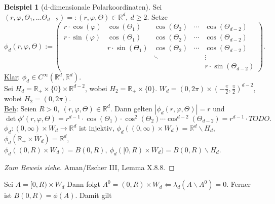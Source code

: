 \documentclass[a4paper]{report}
\newcommand{\R}{\mathbb{R}}
\newcommand{\jlabel}[1]{\label{j_#1}}
\newcommand{\jabb}[3]{ #1: #2 \rightarrow #3 }
\theoremstyle{plain}
\theoremstyle{definition}
\newtheorem{expl}[thm]{Beispiel}
\begin{document}
{{{{\begin{expl}[d-dimensionale Polarkoordinaten]
    \jlabel{Bsp 3.35}
    Sei $(r, \varphi, \Theta_1,\dots \Theta_{d-2}) =: (r,\varphi, \Theta) \in \R^d, \ d\ge 2$. Setze
    \begin{equation}
        \jlabel{(3.8)}
        \phi_d(r,\varphi,\Theta) := \begin{pmatrix}
                                            r\cdot \cos(\varphi) & \cos(\Theta_1)        & \cos(\Theta_2) & \cdots & \cos(\Theta_{d-2})\\
                                            r\cdot \sin(\varphi) & \cos(\Theta_1)        & \cos(\Theta_2) & \cdots & \cos(\Theta_{d-2})\\
                                                                 & r\cdot \sin(\Theta_1) & \cos(\Theta_2) & \cdots & \cos(\Theta_{d-2})\\
                                                                 &                       & \ddots         &        & \vdots \\
                                                                 &                       &                &        & r\cdot \sin(\Theta_{d-2})
                                        \end{pmatrix}.
    \end{equation}
    \uline{Klar}: $\phi_d \in C^\infty(\R^d, \R^d)$.\\
    Sei $H_d = \R_+\times \{0\} \times \R^{d-2}$, wobei $H_2 = \R_+\times \{0\}$. $W_d = (0,2\pi)\times(-\frac{\pi}{2}, \frac{\pi}{2})^{d-2}$, wobei $H_2 = (0,2\pi)$.\\
    \uline{Beh}: Seien $R>0,\ (r, \varphi, \Theta) \in \R^d$. Dann gelten $|\phi_d(r,\varphi, \Theta)| = r$ und
    \[
        \det \phi'(r,\varphi, \Theta) = r^{d-1}\cdot \cos(\Theta_1)\cdot \cos^2(\Theta_2)\cdots \cos^{d-2}(\Theta_{d-2}) = r^{d-1} \cdot TODO.
    \]
    $\jabb{\phi_d}{(0,\infty)\times W_d}{\R^d}$ ist injektiv, $\phi_d((0,\infty)\times W_d) = \R^d\backslash H_d$,\\
    $\phi_d(\R_+\times \overline{W}_d) = \R^d$, $\phi_d((0,R)\times W_d) = B(0,R), \ \phi_d([0,R)\times \overline{W}_d) = B(0,R)\backslash H_d$.
    \begin{proof}[Zum Beweis siehe]
        Aman/Escher III, Lemma X.8.8.
    \end{proof}
    Sei $A = [0,R)\times \overline{W}_d$ Dann folgt $A^0 = (0,R)\times \overline{W}_d \Leftarrow \lambda_d(A\backslash A^0) = 0$. Ferner ist $B(0,R) = \phi(A)$. Damit gilt

\end{expl}}}}}
\end{document}
